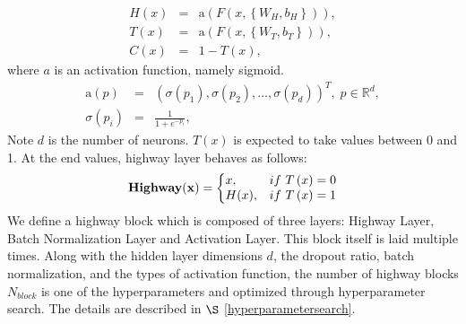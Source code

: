 \documentclass[useamsfonts]{pasj01}
\begin{document}
\begin{eqnarray}
    H \left(x\right) &=& \mathrm{a} \left( F \left(x, \left\{W_H, b_H\right\}\right) \right), \\
    T \left(x\right) &=& \mathrm{a} \left( F \left(x, \left\{W_T, b_T\right\}\right) \right), \\
    C \left(x\right) &=& 1 - T \left(x\right),
\end{eqnarray}
where $a$ is an activation function, namely sigmoid.
\begin{eqnarray*}
    \mathrm{a} \left(p\right) &=& \left( \sigma\left(p_1\right),\sigma\left(p_2\right), \ldots, \sigma\left(p_d\right) \right)^T, \; p \in \mathbb{R}^d, \\
    \sigma \left(p_i\right) &=& \frac{1}{1 + e^{-p_i}},
\end{eqnarray*}
Note $d$ is the number of neurons.  $T(x)$ is expected to take values between 0 and 1.  At the end values, highway layer behaves as follows:
\begin{equation}
    {\bf Highway(x)}=\left\{
    \begin{array}{@{}ll@{}}
      x, & \mathrm{if} \ T \left(x\right)=0 \\
      H(x), & \mathrm{if} \ T \left(x\right)=1 
    \end{array}\right.
\end{equation}
We define a highway block which is composed of three layers: Highway Layer, Batch Normalization Layer and Activation Layer.
This block itself is laid multiple times.
Along with the hidden layer dimensions $d$, the dropout ratio, batch normalization, and the types of activation function, the number of highway blocks $N_{block}$ is one of the hyperparameters and optimized through hyperparameter search.   The details are described in $\S$ \ref{hyperparametersearch}.
\end{document}
